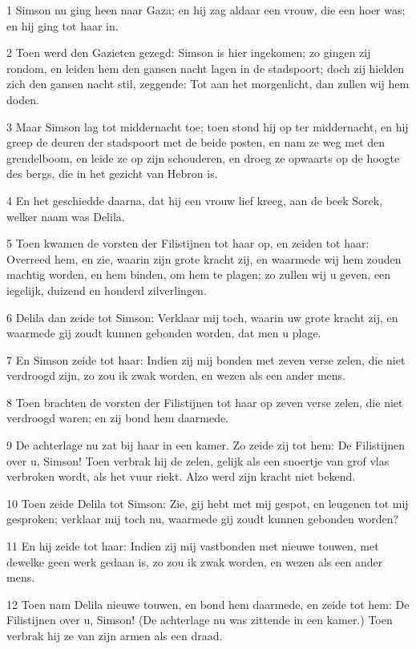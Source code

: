 \par 1 Simson nu ging heen naar Gaza; en hij zag aldaar een vrouw, die een hoer was; en hij ging tot haar in.
\par 2 Toen werd den Gazieten gezegd: Simson is hier ingekomen; zo gingen zij rondom, en leiden hem den gansen nacht lagen in de stadspoort; doch zij hielden zich den gansen nacht stil, zeggende: Tot aan het morgenlicht, dan zullen wij hem doden.
\par 3 Maar Simson lag tot middernacht toe; toen stond hij op ter middernacht, en hij greep de deuren der stadspoort met de beide posten, en nam ze weg met den grendelboom, en leide ze op zijn schouderen, en droeg ze opwaarts op de hoogte des bergs, die in het gezicht van Hebron is.
\par 4 En het geschiedde daarna, dat hij een vrouw lief kreeg, aan de beek Sorek, welker naam was Delila.
\par 5 Toen kwamen de vorsten der Filistijnen tot haar op, en zeiden tot haar: Overreed hem, en zie, waarin zijn grote kracht zij, en waarmede wij hem zouden machtig worden, en hem binden, om hem te plagen; zo zullen wij u geven, een iegelijk, duizend en honderd zilverlingen.
\par 6 Delila dan zeide tot Simson: Verklaar mij toch, waarin uw grote kracht zij, en waarmede gij zoudt kunnen gebonden worden, dat men u plage.
\par 7 En Simson zeide tot haar: Indien zij mij bonden met zeven verse zelen, die niet verdroogd zijn, zo zou ik zwak worden, en wezen als een ander mens.
\par 8 Toen brachten de vorsten der Filistijnen tot haar op zeven verse zelen, die niet verdroogd waren; en zij bond hem daarmede.
\par 9 De achterlage nu zat bij haar in een kamer. Zo zeide zij tot hem: De Filistijnen over u, Simson! Toen verbrak hij de zelen, gelijk als een snoertje van grof vlas verbroken wordt, als het vuur riekt. Alzo werd zijn kracht niet bekend.
\par 10 Toen zeide Delila tot Simson: Zie, gij hebt met mij gespot, en leugenen tot mij gesproken; verklaar mij toch nu, waarmede gij zoudt kunnen gebonden worden?
\par 11 En hij zeide tot haar: Indien zij mij vastbonden met nieuwe touwen, met dewelke geen werk gedaan is, zo zou ik zwak worden, en wezen als een ander mens.
\par 12 Toen nam Delila nieuwe touwen, en bond hem daarmede, en zeide tot hem: De Filistijnen over u, Simson! (De achterlage nu was zittende in een kamer.) Toen verbrak hij ze van zijn armen als een draad.
